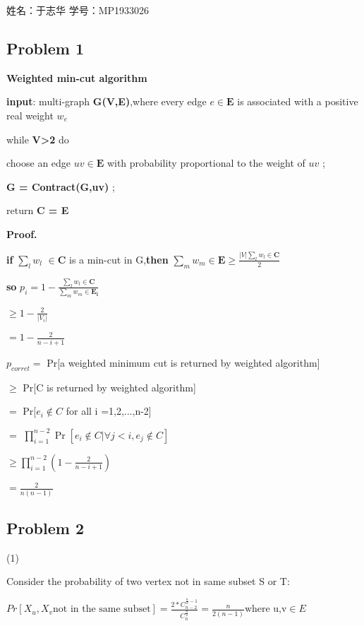\documentclass[]{article}
\date{}
\begin{document}
姓名：于志华 学号：MP1933026

\hypertarget{header-n2}{%
\subsection{Problem 1}\label{header-n2}}


\textbf{Weighted min-cut algorithm}

\textbf{input}: multi-graph \textbf{G(V,E)},where every edge
\(e \in \boldsymbol{E}\) is associated with a positive real weight
\(w_{e}\)


while \textbf{\textbar{}V\textbar{}\textgreater{}2} do

choose an edge \textbf{\( uv \in \boldsymbol {E} \)} with probability
proportional to the weight of \( uv \) ;

\textbf{G = Contract(G,uv)} ;

return \textbf{C = E}


\textbf{Proof.}

\textbf{if} \(\sum_{l}w_{l}\) \( \in\boldsymbol{C} \) is a min-cut in
G,\textbf{then}
\( \sum_{m} w_{m} \in \boldsymbol{E} \geq \frac{|V| \sum_{l}w_{l} \in \boldsymbol{C}}{2} \)

\textbf{so}
\(p_{i} = 1- \frac{\sum_{l}w_{l} \in \boldsymbol{C}}{\sum_{m}w_{m}\in\boldsymbol{E_{i}}}\)

\(\geq 1- \frac{2}{|V_{i}|}\)

\(=1-\frac{2}{n-i+1}\)

\( p_{corret}= \) Pr{[}a weighted minimum cut is returned by weighted
algorithm{]}

\(\geq\) Pr{[}C is returned by weighted algorithm{]}

\( = \) Pr{[}\( e_{i} \notin C \) for all i =1,2,...,n-2{]}

\(=\)
\(\prod_{i=1}^{n-2} \operatorname{Pr}\left[e_{i} \notin C | \forall j<i, e_{j} \notin C\right]\)

\( \geq \prod_{i=1}^{n-2} \left( 1-\frac{2}{n-i+1}\right) \)

\(= \frac{2}{n(n-1)}\)

\hypertarget{header-n26}{%
\subsection{Problem 2}\label{header-n26}}

(1)

Consider the probability of two vertex not in same subset S or T:

\( Pr[X_{u},X_{v} \text{not in the same subset}]=\frac{2*C_{n-2}^{\frac{n}{2}-1}}{C_{n}^{\frac{n}{2}}}=\frac{n}{2(n-1)}\text{where u,v} \in E\)
\end{document}
